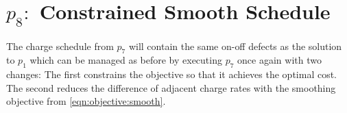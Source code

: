 \section{$p_8:$ Constrained Smooth Schedule\label{sec:constrainedSmoothSchedule}}
 \par The charge schedule from $p_7$ will contain the same on-off defects as the solution to $p_1$ which can be managed as before by executing $p_7$ once again with two changes: The first constrains the objective so that it achieves the optimal cost. The second reduces the difference of adjacent charge rates with the smoothing objective from \eqref{eqn:objective:smooth}.
\\[0.1in] 

